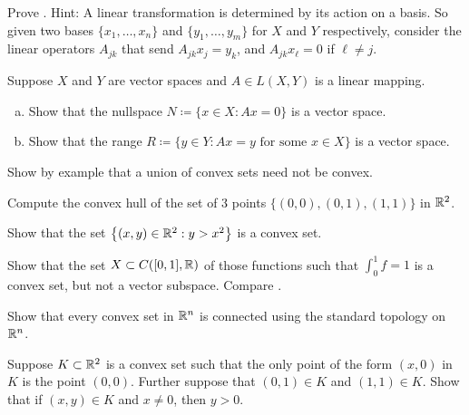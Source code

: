 \begin{exercise}
Prove .  Hint: A linear transformation is determined by
its action on a basis.  So given two bases
$\{ x_1,\ldots,x_n \}$ and
$\{ y_1,\ldots,y_m \}$ for $X$ and $Y$ respectively, consider the linear
operators $A_{jk}$ that send $A_{jk} x_j = y_k$, and 
$A_{jk} x_\ell = 0$ if $\ell \neq j$.
\end{exercise}

\begin{samepage}
\begin{exercise}[Easy]
Suppose $X$ and $Y$ are vector spaces and $A \in L(X,Y)$ is a linear
mapping.
\begin{enumerate}[a)]
\item
Show that the nullspace $N \coloneqq \{ x \in X : Ax = 0 \}$ is a
vector space.
\item
Show that the range $R \coloneqq \{ y \in Y : Ax = y \text{ for some } x \in X \}$ is a
vector space.
\end{enumerate}
\end{exercise}
\end{samepage}

\begin{exercise}[Easy]
Show by example that a union of convex sets need not be convex.
\end{exercise}

\begin{exercise}
Compute the convex hull of the set of 3 points
$\bigl\{ (0,0), (0,1), (1,1) \bigr\}$
in ${\mathbb{R}}^2$.
\end{exercise}

\begin{exercise}
Show that the set $\bigl\{ (x,y) \in {\mathbb{R}}^2 : y > x^2 \bigr\}$ is a convex set.
\end{exercise}

\begin{exercise} \label{exercise:intoneconvex}
Show that the set $X \subset C([0,1],{\mathbb{R}})$ of those functions such 
that $\int_0^1 f = 1$ is a convex set, but not a vector subspace.
Compare .
\end{exercise}


\begin{exercise}
Show that every convex set in ${\mathbb{R}}^n$ is connected using the standard
topology on ${\mathbb{R}}^n$.
\end{exercise}

\begin{exercise}
Suppose $K \subset {\mathbb{R}}^2$ is a convex set such that the only point of
the form $(x,0)$ in $K$ is the point $(0,0)$.  Further suppose that
$(0,1) \in K$ and $(1,1) \in K$.  Show that if $(x,y) \in K$ and $x
\neq 0$, then $y > 0$.
\end{exercise}

